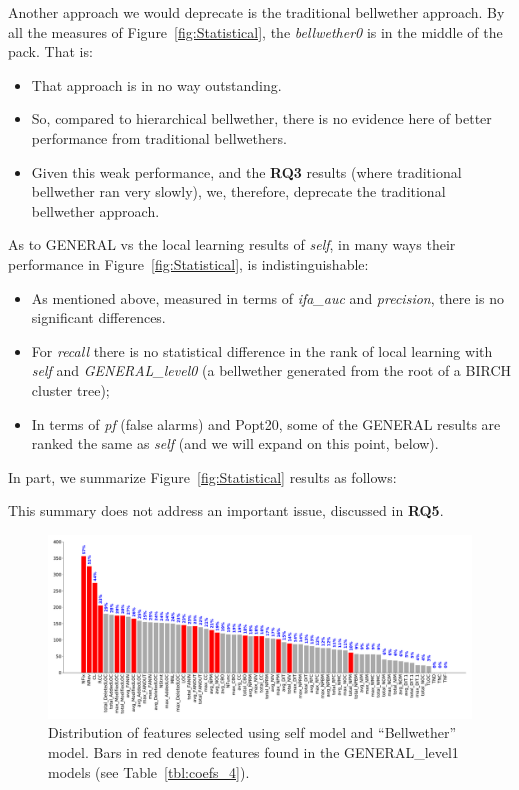 \documentclass[10pt,journal,compsoc]{IEEEtran}
\newcommand{\bi}{\begin{itemize}}
\newcommand{\ei}{\end{itemize}}
\begin{document}
Another approach we would deprecate is the traditional bellwether approach.
By all the measures of
Figure~\ref{fig:Statistical},   the {\em bellwether0} is in the middle of the pack. That is:
\bi
\item
That approach is in no way outstanding. 
\item
So, 
compared to hierarchical bellwether,
 there is no evidence here of better performance
  from    traditional bellwethers.
\item
Given this weak performance, 
and   the {\bf RQ3} results (where traditional bellwether ran very slowly), we, therefore,  
deprecate the traditional bellwether approach.
 \ei
As to GENERAL vs the local learning results of {\em self}, in many ways their performance in  Figure~\ref{fig:Statistical},
is indistinguishable:
\bi
\item As mentioned above, measured in terms of {\em ifa\_auc}
and {\em precision}, there is no significant differences.
\item For {\em recall} there is no statistical difference in the rank
of  local learning with {\em self} and 
  {\em GENERAL\_level0}
(a bellwether
generated from the root of a BIRCH cluster tree); 
\item In terms of {\em pf} (false alarms) and Popt20, some of the GENERAL results are ranked
the same as {\em self} (and we will expand on this point, below).
\ei
In part, we summarize Figure~\ref{fig:Statistical} results as follows:




 \begin{blockquote}
            \end{blockquote}
 
 This summary does not address an important issue, discussed in {\bf RQ5}.
 
 
 


\begin{figure}[!b]
    \centering
    \includegraphics[width=\linewidth]{figs/fss.pdf}
    \caption{Distribution of features selected using self model and ``Bellwether'' model. Bars in red denote features found in the GENERAL\_level1 models (see Table~\ref{tbl:coefs_4}). }
    \label{fig:FSS_level1}
\end{figure}
\end{document}
